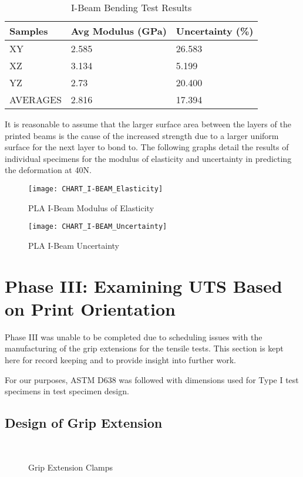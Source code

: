 	\begin{table} [h]
		\centering
		\begin{tabularx}{\linewidth}{ | X | X | X | }
		\hline
			Samples & Avg Modulus (GPa) & Uncertainty (\%) \\ \hline
			XY & 2.585 & 26.583 \\
			XZ & 3.134 & 5.199 \\
			YZ & 2.73 & 20.400 \\ \hline
			AVERAGES & 2.816 & 17.394 \\ \hline
		\end{tabularx}
		\caption{I-Beam Bending Test Results}
		\label{tab:ibeam_bending_results}
	\end{table}

It is reasonable to assume that the larger surface area between the layers of the printed beams is the cause of the increased strength due to a larger uniform surface for the next layer to bond to. The following graphs detail the results of individual specimens for the modulus of elasticity and uncertainty in predicting the deformation at 40N.

	\begin{figure} [H]
		\centering
		\texttt{[image: CHART\_I-BEAM\_Elasticity]}
		\caption{PLA I-Beam Modulus of Elasticity}
		\label{fig:ibeam_Modulus}
	\end{figure}
	
	\begin{figure} [H]
		\centering
		\texttt{[image: CHART\_I-BEAM\_Uncertainty]}
		\caption{PLA I-Beam Uncertainty}
		\label{fig:ibeam_Uncertanty}
	\end{figure}

\section{Phase III: Examining UTS Based on Print Orientation}
Phase III was unable to be completed due to scheduling issues with the manufacturing of the grip extensions for the tensile tests. This section is kept here for record keeping and to provide insight into further work.

For our purposes, ASTM D638 was followed with dimensions used for Type I test specimens \citep{ASTMNorma2004} in test specimen design.


\subsection{Design of Grip Extension}
\begin{figure} [H]
\centering
	\caption{\label{ref_label_overall}Grip Extension Clamps}
	\
	\
	\
\end{figure}

